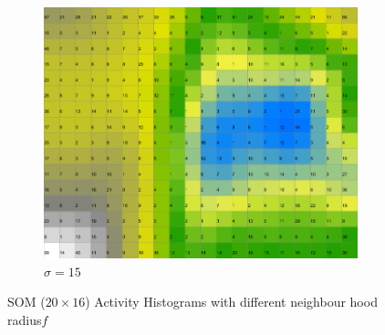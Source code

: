 \documentclass{acm_proc_article-sp}
\begin{document}
\begin{figure}
\begin{subfigure}[b]{0.30\linewidth}
    \end{subfigure}
    \begin{subfigure}[b]{0.30\linewidth}
        \includegraphics[width=\linewidth]{img/wine-newmid-activity-histogram-sigma-15}
        \caption{$\sigma=15$}
        \label{fig:wine-newmid-activity-histogram-sigma-15}
    \end{subfigure}
    \caption{SOM ($20\times16$) Activity Histograms with different neighbour hood radius$f$}
    \label{fig:wine-newmid-activity-histogram-sigma}
\end{figure}
\end{document}
